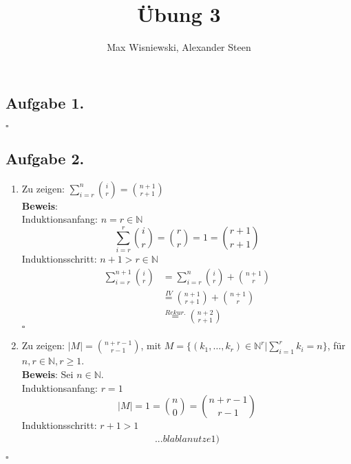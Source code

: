 \documentclass[11pt,a4paper,ngerman]{article}
\date{}
\title{Übung 3}
\author{Max Wisniewski, Alexander Steen}
\begin{document}

\renewcommand{\figurename}{Figure}

\maketitle
\thispagestyle{fancy}

\subsection*{Aufgabe 1.}
\mbox{}\hfill$\square$

\subsection*{Aufgabe 2.}
\begin{enumerate}
  \item Zu zeigen: $\sum_{i=r}^{n}{\binom{i}{r}} = \binom{n+1}{r+1}$ \\
        \textbf{Beweis}:\\
        Induktionsanfang: $n = r \in \mathbb{N}$
        \begin{equation*}
          \sum_{i=r}^{r}{\binom{i}{r}} = \binom{r}{r} = 1 = \binom{r+1}{r+1}
        \end{equation*}
        Induktionsschritt: $n+1 > r \in \mathbb{N}$
        \begin{equation*}\begin{split}
          \sum_{i=r}^{n+1}{\binom{i}{r}} &= \sum_{i=r}^{n}{\binom{i}{r}} + \binom{n+1}{r} \\
          &\stackrel{IV}{=} \binom{n+1}{r+1} + \binom{n+1}{r}\\
          &\stackrel{Rekur.}{=} \binom{n+2}{r+1}
        \end{split}\end{equation*}
\mbox{}\hfill$\square$
  \item Zu zeigen: $|M| =\binom{n+r-1}{r-1}$, mit $M =  \{ (k_1,\ldots,k_r) \in \mathbb{N}^r | \sum_{i=1}^r k_i = n\} $, für $n,r \in \mathbb{N}, r \geq 1$. \\
        \textbf{Beweis}: Sei $n \in \mathbb{N}$.\\
        Induktionsanfang: $r = 1$
        \begin{equation*}
           |M| \stackrel{}{=} 1 = \binom{n}{0} = \binom{n+r-1}{r-1}
        \end{equation*}
        Induktionsschritt: $r+1 > 1$
        \begin{equation*}\begin{split}
            ...blabla nutze 1)
        \end{split}\end{equation*}
\end{enumerate}
\mbox{}\hfill$\square$
\end{document}
